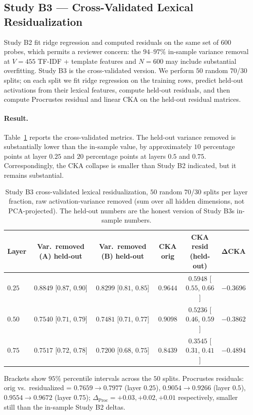 \subsection{Study B3 — Cross-Validated Lexical Residualization}
\label{sec:results-study-b-double-prime}

Study B2 fit ridge regression and computed residuals on the same set
of $600$ probes, which permits a reviewer concern: the $94$--$97\%$
in-sample variance removal at $V = 455$ TF-IDF + template features
and $N = 600$ may include substantial overfitting. Study B3 is the
cross-validated version. We perform $50$ random $70$/$30$ splits;
on each split we fit ridge regression on the training rows, predict
held-out activations from their lexical features, compute held-out
residuals, and then compute Procrustes residual and linear CKA on
the held-out residual matrices.

\paragraph{Result.} Table~\ref{tab:study-b-double-prime} reports the
cross-validated metrics. The held-out variance removed is
substantially lower than the in-sample value, by approximately $10$
percentage points at layer $0.25$ and $20$ percentage points at
layers $0.5$ and $0.75$. Correspondingly, the CKA collapse is smaller
than Study B2 indicated, but it remains substantial.

\begin{table}[h]
\centering
\caption{Study B3 cross-validated lexical residualization,
$50$ random $70$/$30$ splits per layer fraction, raw
activation-variance removed (sum over all hidden dimensions, not
PCA-projected). The held-out numbers are the honest version of
Study B3s in-sample numbers.}
\label{tab:study-b-double-prime}
\begin{tabular}{l c c c c c}
\toprule
Layer & Var.\ removed (A) held-out & Var.\ removed (B) held-out & CKA orig & CKA resid (held-out) & ΔCKA \\
\midrule
$0.25$ & $0.8849$ [$0.87$, $0.90$] & $0.8299$ [$0.81$, $0.85$] & $0.9644$ & $0.5948$ [$0.55$, $0.66$] & $-0.3696$ \\
$0.50$ & $0.7540$ [$0.71$, $0.79$] & $0.7481$ [$0.71$, $0.77$] & $0.9098$ & $0.5236$ [$0.46$, $0.59$] & $-0.3862$ \\
$0.75$ & $0.7517$ [$0.72$, $0.78$] & $0.7200$ [$0.68$, $0.75$] & $0.8439$ & $0.3545$ [$0.31$, $0.41$] & $-0.4894$ \\
\bottomrule
\end{tabular}

\smallskip
\small{Brackets show $95\%$ percentile intervals across the $50$ splits.
Procrustes residuals: orig vs.\ residualized = $0.7659 \to 0.7977$
(layer $0.25$), $0.9054 \to 0.9266$ (layer $0.5$), $0.9554 \to
0.9672$ (layer $0.75$); $\Delta_\text{Proc} = +0.03, +0.02, +0.01$
respectively, smaller still than the in-sample Study B2 deltas.}
\end{table}

